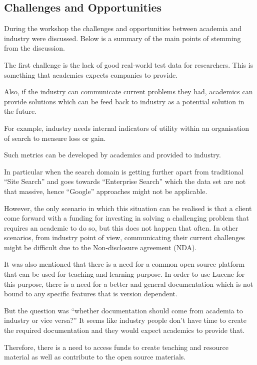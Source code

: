 \subsection{Challenges and Opportunities}
During the workshop the challenges and opportunities between academia and industry were discussed. Below is a summary of the main points of stemming from the discussion.

The first challenge is the lack of good real-world test data for researchers. This is something that academics expects companies to provide. 

Also, if the industry can communicate current problems they had, academics can provide solutions which can be feed back to industry as a potential solution in the future. 

For example, industry needs internal indicators of utility within an organisation of search to measure loss or gain. 

Such metrics can be developed by academics and provided to industry. 

In particular when the search domain is getting further apart from traditional ``Site Search'' and goes towards ``Enterprise Search'' which the data set are not that massive, hence ``Google'' approaches might not be applicable. 

However, the only scenario in which this situation can be realised is that a client come forward with a funding for investing in solving a challenging problem that requires an academic to do so, but this does not happen that often. 
In other scenarios, from industry point of view, communicating their current challenges might be difficult due to the Non-disclosure agreement (NDA).

It was also mentioned that there is a need for a common open source platform that can be used for teaching and learning purpose. 
In order to use Lucene for this purpose, there is a need for a better and general documentation which is not bound to any specific features that is version dependent. 

But the question was ``whether documentation should come from academia to industry or vice versa?''
It seems like industry people don't have time to create the required documentation and they would expect academics to provide that. 

Therefore, there is a need to access funds to create teaching and resource material as well as contribute to the open source materials. 

